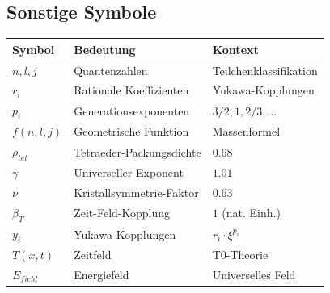 \documentclass[12pt,a4paper]{article}
\begin{document}
\subsection{Sonstige Symbole}
\begin{longtable}{lll}
	\toprule
	\textbf{Symbol} & \textbf{Bedeutung} & \textbf{Kontext} \\
	\midrule
	$n, l, j$ & Quantenzahlen & Teilchenklassifikation \\
	$r_i$ & Rationale Koeffizienten & Yukawa-Kopplungen \\
	$p_i$ & Generationsexponenten & $3/2, 1, 2/3, ...$ \\
	$f(n,l,j)$ & Geometrische Funktion & Massenformel \\
	$\rho_{tet}$ & Tetraeder-Packungsdichte & $0.68$ \\
	$\gamma$ & Universeller Exponent & $1.01$ \\
	$\nu$ & Kristallsymmetrie-Faktor & $0.63$ \\
	$\beta_T$ & Zeit-Feld-Kopplung & $1$ (nat. Einh.) \\
	$y_i$ & Yukawa-Kopplungen & $r_i \cdot \xi^{p_i}$ \\
	$T(x,t)$ & Zeitfeld & T0-Theorie \\
	$E_{field}$ & Energiefeld & Universelles Feld \\
	\bottomrule
\end{longtable}
\end{document}
